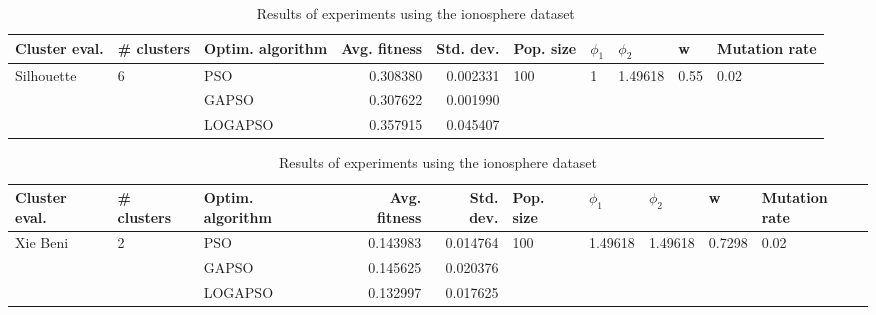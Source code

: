 \documentclass{article}
\begin{document}
\begin{table}
\centering
\caption{Results of experiments using the ionosphere dataset}
\begin{tabular}{lllrrlllll}
\toprule
              Cluster eval. &        \# clusters & Optim. algorithm &  Avg. fitness &  Std. dev. &            Pop. size &         $\phi_{1}$ &               $\phi_{2}$ &                     w &         Mutation rate \\
\midrule
\multirow{3}{*}{Silhouette} & \multirow{3}{*}{6} &              PSO &      0.308380 &   0.002331 & \multirow{3}{*}{100} & \multirow{3}{*}{1} & \multirow{3}{*}{1.49618} & \multirow{3}{*}{0.55} & \multirow{3}{*}{0.02} \\
                            &                    &            GAPSO &      0.307622 &   0.001990 &                      &                    &                          &                       &                       \\
                            &                    &          LOGAPSO &      0.357915 &   0.045407 &                      &                    &                          &                       &                       \\
\bottomrule
\end{tabular}
\end{table}
\begin{table}
\centering
\caption{Results of experiments using the ionosphere dataset}
\begin{tabular}{lllrrlllll}
\toprule
            Cluster eval. &        \# clusters & Optim. algorithm &  Avg. fitness &  Std. dev. &            Pop. size &               $\phi_{1}$ &               $\phi_{2}$ &                       w &         Mutation rate \\
\midrule
\multirow{3}{*}{Xie Beni} & \multirow{3}{*}{2} &              PSO &      0.143983 &   0.014764 & \multirow{3}{*}{100} & \multirow{3}{*}{1.49618} & \multirow{3}{*}{1.49618} & \multirow{3}{*}{0.7298} & \multirow{3}{*}{0.02} \\
                          &                    &            GAPSO &      0.145625 &   0.020376 &                      &                          &                          &                         &                       \\
                          &                    &          LOGAPSO &      0.132997 &   0.017625 &                      &                          &                          &                         &                       \\
\bottomrule
\end{tabular}
\end{table}
\end{document}
